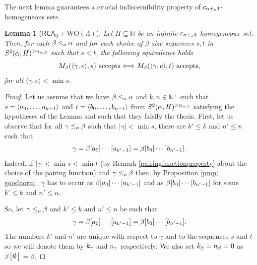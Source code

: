 \documentclass[11pt]{amsart}
\newtheorem{lemma}[thm]{Lemma}
\theoremstyle{definition}
\theoremstyle{remark}
\theoremstyle{plain}
\newcommand{\numberset}{\mathbb}
\newcommand{\N}{\numberset{N}}
\def\a{\alpha}
\def\b{\beta}
\newcommand{\RCA}{\mathsf{RCA}_0}
\def\WO{{\textrm{WO}}}
\newcommand{\leqo}{\leq\sb{o}}
\newcommand{\pluso}{+\sb{o}}
\def\N{{\mathbb{N}}}
\newcommand{\homo}{homogeneous}
\def\ifff{\Longleftrightarrow}
\newcommand{\lorenzo}[1]{\textcolor{blue}{#1}}
\begin{document}
The next lemma guarantees a crucial indiscernibility property of $c_{\alpha\pluso3}$-homogeneous sets.

\begin{lemma}[$\RCA+\WO(\Lambda)$]\label{lem:lem:eq:homo:wit}
Let $H\subseteq\N$ be an infinite $c\sb{\alpha \pluso3}$-\homo\ set. 
Then, for each $\beta\leqo \alpha$ and for each choice of $\beta$-size sequences $s,t$ in $S\sp2(\alpha,H)\sp{>n_{\a,\b}}$ such that $s < t$, the following equivalence holds
$$
M\sb\beta(\langle \gamma,e\rangle,s)\mbox{ accepts} \ifff
M\sb\beta(\langle \gamma,e\rangle,t)\mbox{ accepts},
$$
for all $\langle \gamma,e\rangle<\min s$.
\end{lemma}

\begin{proof}
Let us assume that we have $\beta\leqo\alpha$
and $k, n \in \N^+$ such that $s=\langle a\sb0,\dots,a\sb {k-1}\rangle$ and  $t=\langle b\sb0,\dots, b\sb {n-1}\rangle$ from $S\sp2(\alpha,H)\sp{>n_{\a,\b}}$ satisfying the hypotheses of the Lemma and such that they falsify the thesis.
First, let us observe that for all $\gamma\leqo \beta$ such that $|\gamma | < \min s$, there are $k'\leq k$ and $n'\leq n$ such that 
$$
\gamma=\beta[a\sb0]\cdots [a\sb{k'-1}]=\beta[b\sb0]\cdots[b\sb{n'-1}].
$$
Indeed, if $|\gamma| < \min s < \min t$ (by Remark \ref{pairingfunctionproperty} about the choice of the pairing function) and $\gamma\leqo \beta$ then, by Proposition \ref{prop: goodnorm}, $\gamma$ has to occur as $\beta[a\sb0]\cdots [a\sb{k'-1}]$ and as $\beta[b\sb0]\cdots [b\sb{n'-1}]$ for some $k'\leq k$ and $n'\leq n$. 

So, let $\gamma\leqo\beta$ and $k'\leq k$ and $n' \leq n$ be such that 
$$
\gamma=\beta[a\sb0]\cdots [a\sb{k'-1}]=\beta[b\sb0]\cdots [b\sb{n'-1}].
$$
The numbers $k'$ and $n'$ are unique with respect to $\gamma$ and to the sequences $s$ and $t$ so we will denote them by $k\sb\gamma$ and $n\sb\gamma$ respectively. 
We also set $k\sb\beta=n\sb\beta=0$ as $\beta[\emptyset]=\beta$. 



\end{proof}
\end{document}
